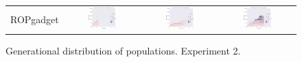 \documentclass{article}
\begin{document}
\begin{landscape}
\begin{figure}[t]
\begin{center}
\begin{tabular}{c c c c}
    ROPgadget & \includegraphics[align=c,width=0.42\textwidth]{gd/e2/4} & \includegraphics[align=c,width=0.42\textwidth]{gd/e2/5} & \includegraphics[align=c,width=0.42\textwidth]{gd/e2/6} \\
\end{tabular}
\end{center}
\caption{Generational distribution of populations. Experiment 2.}
\label{fig:gd/e2}
\end{figure}


\end{landscape}
\end{document}
